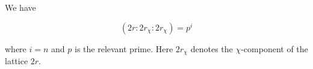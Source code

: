 We have

$$
(2r : 2r_\chi : 2r_\chi) = p^i
$$

where $i = n$ and $p$ is the relevant prime. Here $2r_\chi$ denotes the $\chi$-component of the lattice $2r$.